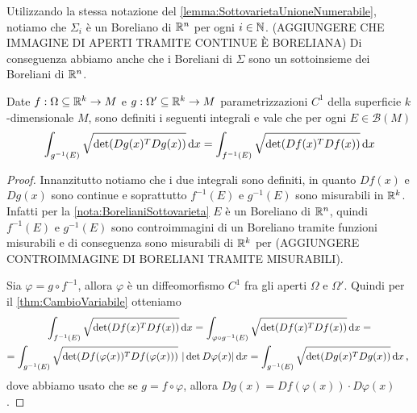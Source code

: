 \begin{remark}\label{nota:BorelianiSottovarieta}
	Utilizzando la stessa notazione del \cref{lemma:SottovarietaUnioneNumerabile}, notiamo che $\Sigma_i$ è un Boreliano di $\mathbb R^n$ per ogni $i\in\mathbb N$. (AGGIUNGERE CHE IMMAGINE DI APERTI TRAMITE CONTINUE È BORELIANA) Di conseguenza abbiamo anche che i Boreliani di $\Sigma$ sono un sottoinsieme dei Boreliani di $\mathbb R^n$.
\end{remark}


\begin{lemma}\label{lemma:InvarianzaImmersione}
	Date $f:\Omega\subseteq\mathbb R^k\to M$ e $g:\Omega'\subseteq\mathbb R^k\to M$ parametrizzazioni $C^1$ della superficie $k$-dimensionale $M$, sono definiti i seguenti integrali e vale che per ogni $E\in\mathcal{B}(M)$
	\begin{equation*}
		\int_{g^{-1}(E)}\sqrt{\det(Dg(x)^TDg(x))}\,\mathrm d x=\int_{f^{-1}(E)}\sqrt{\det(Df(x)^TDf(x))}\,\mathrm d x
	\end{equation*}
\end{lemma}
\begin{proof}
	Innanzitutto notiamo che i due integrali sono definiti, in quanto $Df(x)$ e $Dg(x)$ sono continue e soprattutto $f^{-1}(E)$ e $g^{-1}(E)$ sono misurabili in $\mathbb R^k$. Infatti per la \cref{nota:BorelianiSottovarieta} $E$ è un Boreliano di $\mathbb R^n$, quindi $f^{-1}(E)$ e $g^{-1}(E)$ sono controimmagini di un Boreliano tramite funzioni misurabili e di conseguenza sono misurabili di $\mathbb R^k$ per (AGGIUNGERE CONTROIMMAGINE DI BORELIANI TRAMITE MISURABILI). 

	Sia $\varphi=g\circ f^{-1}$, allora $\varphi$ è un diffeomorfismo $C^1$ fra gli aperti $\Omega$ e $\Omega'$. Quindi per il \cref{thm:CambioVariabile} otteniamo
	\begin{multline*}
		\int_{f^{-1}(E)}\sqrt{\det(Df(x)^TDf(x))}\de x=\int_{\varphi\circ g^{-1}(E)}\sqrt{\det(Df(x)^TDf(x))}\de x=\\
		=\int_{g^{-1}(E)}\sqrt{\det(Df(\varphi(x))^TDf(\varphi(x)))}\ |\det D\varphi(x)|\de x=\int_{g^{-1}(E)}\sqrt{\det(Dg(x)^TDg(x))}\de x\virgola
	\end{multline*}
	dove abbiamo usato che se $g=f\circ \varphi$, allora $Dg(x)=Df(\varphi(x))\cdot D\varphi(x)$.
\end{proof}

